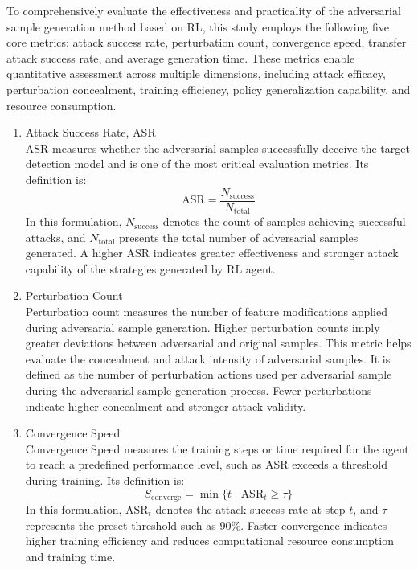 To comprehensively evaluate the effectiveness and practicality of the adversarial sample generation method based on RL, this study employs the following five core metrics: attack success rate, perturbation count, convergence speed, transfer attack success rate, and average generation time. These metrics enable quantitative assessment across multiple dimensions, including attack efficacy, perturbation concealment, training efficiency, policy generalization capability, and resource consumption.

\begin{enumerate}[label=\arabic*)]
	\item Attack Success Rate, ASR \\
	ASR measures whether the adversarial samples successfully deceive the target detection model and is one of the most critical evaluation metrics. Its definition is:
	\begin{equation}
		\text{ASR} = \frac{N_{\text{success}}}{N_{\text{total}}}
		\tag{5.5}
	\end{equation}
	In this formulation, $N_{\text{success}}$ denotes the count of samples achieving successful attacks, and $N_{\text{total}}$ presents the total number of adversarial samples generated. A higher ASR indicates greater effectiveness and stronger attack capability of the strategies generated by RL agent.
	
	\item Perturbation Count \\
	Perturbation count measures the number of feature modifications applied during adversarial sample generation. Higher perturbation counts imply greater deviations between adversarial and original samples. This metric helps evaluate the concealment and attack intensity of adversarial samples. It is defined as the number of perturbation actions used per adversarial sample during the adversarial sample generation process. Fewer perturbations indicate higher concealment and stronger attack validity.
	
	\item Convergence Speed\\
	Convergence Speed measures the training steps or time required for the agent to reach a predefined performance level, such as ASR exceeds a threshold during training. Its definition is:
	\begin{equation}
		S_{\text{converge}} = \min\{t \mid \text{ASR}_t \geq \tau\}
		\tag{5.6}
	\end{equation}
	In this formulation, $\text{ASR}_t$ denotes the attack success rate at step $t$, and $\tau$ represents the preset threshold such as 90\%. Faster convergence indicates higher training efficiency and reduces computational resource consumption and training time.
	

\end{enumerate}
